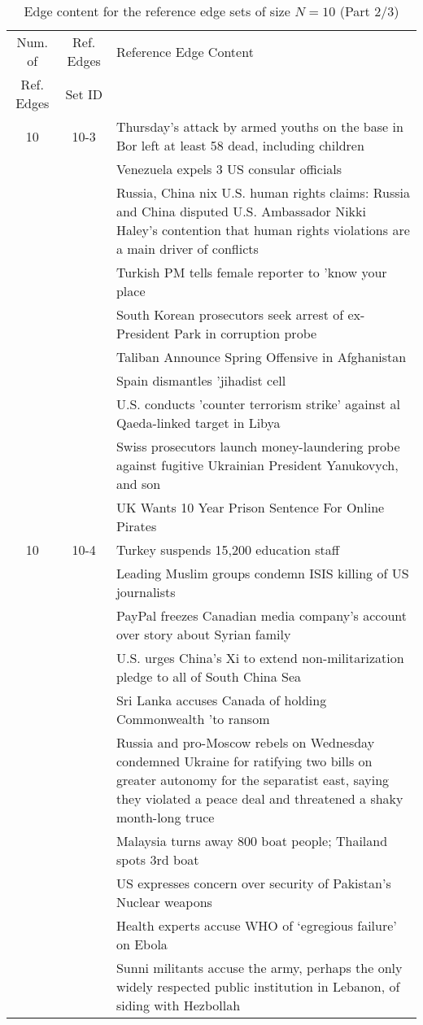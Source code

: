 \begin{table}[H]
\begin{tabular}{cc p{10cm}}
\toprule
\multicolumn{1}{c}{Num. of}			& \multicolumn{1}{c}{Ref. Edges}		& \multicolumn{1}{l}{Reference Edge Content} \\
\multicolumn{1}{c}{Ref. Edges}		& \multicolumn{1}{c}{Set ID}			& \multicolumn{1}{c}{} \\
\midrule
10 & 10-3 & Thursday's attack by armed youths on the base in Bor left at least 58 dead, including children \\
 &  & Venezuela expels 3 US consular officials \\
 &  & Russia, China nix U.S. human rights claims: Russia and China disputed U.S. Ambassador Nikki Haley's contention that human rights violations are a main driver of conflicts \\
 &  & Turkish PM tells female reporter to 'know your place \\
 &  & South Korean prosecutors seek arrest of ex-President Park in corruption probe \\
 &  & Taliban Announce Spring Offensive in Afghanistan \\
 &  & Spain dismantles 'jihadist cell \\
 &  & U.S. conducts 'counter terrorism strike' against al Qaeda-linked target in Libya \\
 &  & Swiss prosecutors launch money-laundering probe against fugitive Ukrainian President Yanukovych, and son \\
 &  & UK Wants 10 Year Prison Sentence For Online Pirates \\
\hline
10 & 10-4 & Turkey suspends 15,200 education staff \\
 &  & Leading Muslim groups condemn ISIS killing of US journalists \\
 &  & PayPal freezes Canadian media company's account over story about Syrian family \\
 &  & U.S. urges China's Xi to extend non-militarization pledge to all of South China Sea \\
 &  & Sri Lanka accuses Canada of holding Commonwealth 'to ransom \\
 &  & Russia and pro-Moscow rebels on Wednesday condemned Ukraine for ratifying two bills on greater autonomy for the separatist east, saying they violated a peace deal and threatened a shaky month-long truce \\
 &  & Malaysia turns away 800 boat people; Thailand spots 3rd boat \\
 &  & US expresses concern over security of Pakistan’s Nuclear weapons \\
 &  & Health experts accuse WHO of ‘egregious failure’ on Ebola \\
 &  & Sunni militants accuse the army, perhaps the only widely respected public institution in Lebanon, of siding with Hezbollah \\
\bottomrule
\end{tabular}
\caption{Edge content for the reference edge sets of size \(N = 10\) (Part 2/3)}
\label{tab:ref-edge-sets-nref-10-part-2}
\end{table}


